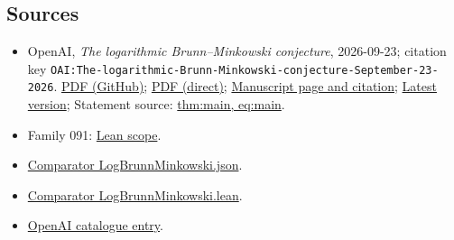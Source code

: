 \documentclass[11pt]{article}
\begin{document}
\subsection{Sources}
\begin{itemize}
\item OpenAI, \emph{The logarithmic Brunn–Minkowski conjecture}, 2026-09-23; citation key \texttt{OAI:The-logarithmic-Brunn-Minkowski-conjecture-September-23-2026}. \href{https://github.com/openai/math/blob/adc7f1241b42e322a6451854ab7e4b4c146bf78a/preprints/The-logarithmic-Brunn-Minkowski-conjecture-September-23-2026/paper.pdf}{PDF (GitHub)}; \href{https://github.com/openai/math/raw/adc7f1241b42e322a6451854ab7e4b4c146bf78a/preprints/The-logarithmic-Brunn-Minkowski-conjecture-September-23-2026/paper.pdf}{PDF (direct)}; \href{https://github.com/openai/math/blob/adc7f1241b42e322a6451854ab7e4b4c146bf78a/preprints/The-logarithmic-Brunn-Minkowski-conjecture-September-23-2026/README.md}{Manuscript page and citation}; \href{https://github.com/openai/math/blob/main/preprints/The-logarithmic-Brunn-Minkowski-conjecture-September-23-2026/paper.pdf}{Latest version}; Statement source: \href{https://github.com/openai/math/blob/adc7f1241b42e322a6451854ab7e4b4c146bf78a/preprints/The-logarithmic-Brunn-Minkowski-conjecture-September-23-2026/build/introduction.tex\#L21}{thm:main, eq:main}.
\item Family 091: \href{https://github.com/openai/math/blob/adc7f1241b42e322a6451854ab7e4b4c146bf78a/lean/docs/091.md}{Lean scope}.
\item \href{https://github.com/openai/math/blob/adc7f1241b42e322a6451854ab7e4b4c146bf78a/lean/ComparatorChallenges/LogBrunnMinkowski.json}{Comparator LogBrunnMinkowski.json}.
\item \href{https://github.com/openai/math/blob/adc7f1241b42e322a6451854ab7e4b4c146bf78a/lean/ComparatorChallenges/LogBrunnMinkowski.lean}{Comparator LogBrunnMinkowski.lean}.
\item \href{https://github.com/openai/math/blob/adc7f1241b42e322a6451854ab7e4b4c146bf78a/CONTENTS.md}{OpenAI catalogue entry}.
\end{itemize}
\end{document}
